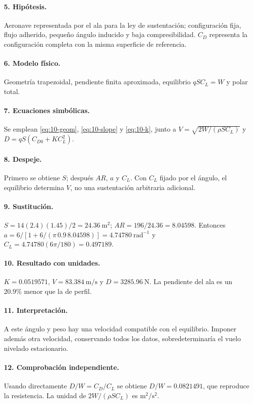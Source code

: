 \paragraph{5. Hipótesis.} Aeronave representada por el ala para la ley de sustentación; configuración fija, flujo adherido, pequeño ángulo inducido y baja compresibilidad. $C_D$ representa la configuración completa con la misma superficie de referencia.
\paragraph{6. Modelo físico.} Geometría trapezoidal, pendiente finita aproximada, equilibrio $qSC_L=W$ y polar total.
\paragraph{7. Ecuaciones simbólicas.} Se emplean \eqref{eq:10-geom}, \eqref{eq:10-slope} y \eqref{eq:10-k}, junto a $V=\sqrt{2W/(\rho SC_L)}$ y $D=qS(C_{D0}+KC_L^2)$.
\paragraph{8. Despeje.} Primero se obtiene $S$; después $AR$, $a$ y $C_L$. Con $C_L$ fijado por el ángulo, el equilibrio determina $V$, no una sustentación arbitraria adicional.
\paragraph{9. Sustitución.} $S=14(2.4)(1.45)/2=24.36\ \mathrm{m^2}$; $AR=196/24.36=8.04598$. Entonces $a=6/[1+6/(\pi\,0.9\,8.04598)]=4.74780\ \mathrm{rad^{-1}}$ y $C_L=4.74780(6\pi/180)=0.497189$.
\paragraph{10. Resultado con unidades.} $K=0.0519571$, $V=83.384\ \mathrm{m/s}$ y $D=3285.96\ \mathrm N$. La pendiente del ala es un $20.9\%$ menor que la de perfil.
\paragraph{11. Interpretación.} A este ángulo y peso hay una velocidad compatible con el equilibrio. Imponer además otra velocidad, conservando todos los datos, sobredeterminaría el vuelo nivelado estacionario.
\paragraph{12. Comprobación independiente.} Usando directamente $D/W=C_D/C_L$ se obtiene $D/W=0.0821491$, que reproduce la resistencia. La unidad de $2W/(\rho SC_L)$ es $\mathrm{m^2/s^2}$.
